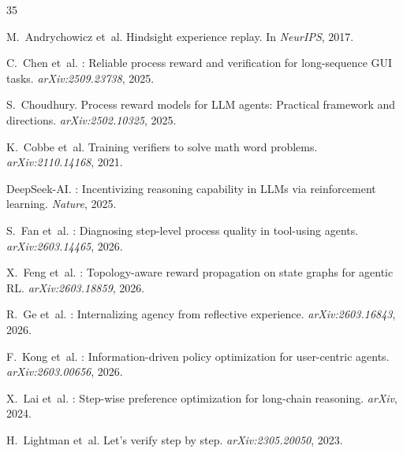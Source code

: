 \documentclass[11pt]{article}
\begin{document}

\begin{thebibliography}{35}

M.~Andrychowicz et~al.
\newblock Hindsight experience replay.
\newblock In \emph{NeurIPS}, 2017.

C.~Chen et~al.
: Reliable process reward and verification for long-sequence {GUI} tasks.
\newblock \emph{arXiv:2509.23738}, 2025.

S.~Choudhury.
\newblock Process reward models for {LLM} agents: Practical framework and directions.
\newblock \emph{arXiv:2502.10325}, 2025.

K.~Cobbe et~al.
\newblock Training verifiers to solve math word problems.
\newblock \emph{arXiv:2110.14168}, 2021.

{DeepSeek-AI}.
: Incentivizing reasoning capability in {LLMs} via reinforcement learning.
\newblock \emph{Nature}, 2025.

S.~Fan et~al.
: Diagnosing step-level process quality in tool-using agents.
\newblock \emph{arXiv:2603.14465}, 2026.

X.~Feng et~al.
: Topology-aware reward propagation on state graphs for agentic {RL}.
\newblock \emph{arXiv:2603.18859}, 2026.

R.~Ge et~al.
: Internalizing agency from reflective experience.
\newblock \emph{arXiv:2603.16843}, 2026.

F.~Kong et~al.
: Information-driven policy optimization for user-centric agents.
\newblock \emph{arXiv:2603.00656}, 2026.

X.~Lai et~al.
: Step-wise preference optimization for long-chain reasoning.
\newblock \emph{arXiv}, 2024.

H.~Lightman et~al.
\newblock Let's verify step by step.
\newblock \emph{arXiv:2305.20050}, 2023.


\end{thebibliography}
\end{document}
